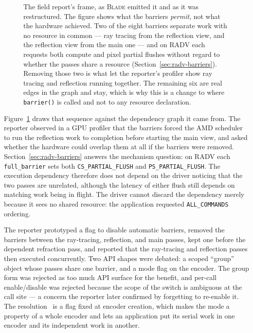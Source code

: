\documentclass[10pt,twocolumn]{article}
\newcommand{\blade}{\textsc{Blade}}
\begin{document}
\begin{figure}[t]
\begin{tikzpicture}
\end{tikzpicture}
\caption{The field report's frame, as \blade{} emitted it and as it was
restructured. The figure shows what the barriers \emph{permit}, not what the
hardware achieved. Two of the eight barriers separate work with no resource in
common --- ray tracing from the reflection view, and the reflection view from
the main one --- and on RADV each requests both compute and pixel partial
flushes without regard to whether the passes share a resource
(Section~\ref{sec:radv-barriers}). Removing those two is what let the
reporter's profiler show ray tracing and reflection running together. The
remaining six are real edges in the graph and stay, which is why this is a
change to where \texttt{barrier()} is called and not to any resource
declaration.}
\label{fig:field-report}
\end{figure}

Figure~\ref{fig:field-report} draws that sequence against the dependency
graph it came from. The reporter observed in a GPU profiler that the barriers
forced the AMD scheduler to run the reflection work to completion before
starting the main view, and asked whether the hardware could overlap them at all if the barriers
were removed. Section~\ref{sec:radv-barriers} answers the mechanism question:
on RADV each \texttt{full\_barrier} sets both \texttt{CS\_PARTIAL\_FLUSH} and
\texttt{PS\_PARTIAL\_FLUSH}. The execution dependency therefore does not
depend on the driver noticing that the two passes are unrelated, although the
latency of either flush still depends on matching work being in flight. The
driver cannot discard the dependency merely because it sees no shared
resource: the application requested \texttt{ALL\_COMMANDS} ordering.

The reporter prototyped a flag to disable automatic barriers, removed the
barriers between the ray-tracing, reflection, and main passes, kept one before
the dependent refraction pass, and reported that the ray-tracing and reflection
passes then executed concurrently. Two API shapes were debated: a scoped
``group'' object whose passes share one barrier, and a mode flag on the
encoder. The group form was rejected as too much API surface for the
benefit, and per-call enable/disable was rejected because the scope of the
switch is ambiguous at the call site --- a concern the reporter later confirmed
by forgetting to re-enable it. The resolution~\cite{blade-pr-355} is a flag
fixed at encoder creation, which makes the mode a property of a whole encoder
and lets an application put its serial work in one encoder and its independent
work in another.
\end{document}

